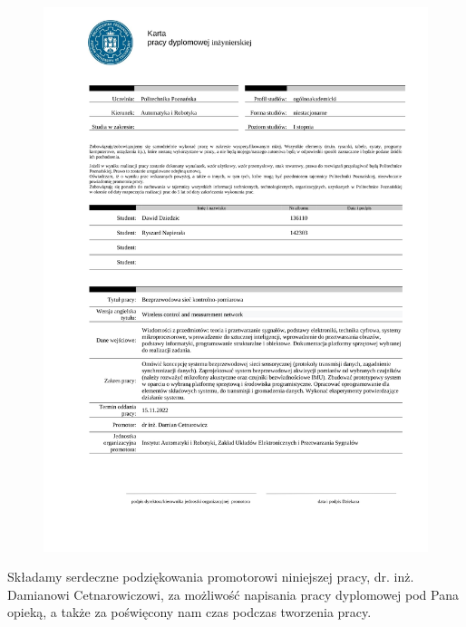 \documentclass[12pt,oneside,a4paper]{book}
\theoremstyle{break}
\begin{document}
\begin{figure}[H]
    \begin{center}
        \includegraphics[width=1\textwidth]{karta.png}   
    \end{center}
\end{figure}

\newpage

\vspace*{16cm}
\begin{flushright}
    Składamy serdeczne podziękowania promotorowi niniejszej pracy, dr. inż. Damianowi Cetnarowiczowi,
    za możliwość napisania pracy dyplomowej pod Pana opieką, a także za poświęcony nam czas podczas tworzenia pracy.
\end{flushright}

\tableofcontents
\listoffigures
\listoftables
\thispagestyle{empty}
\end{document}
